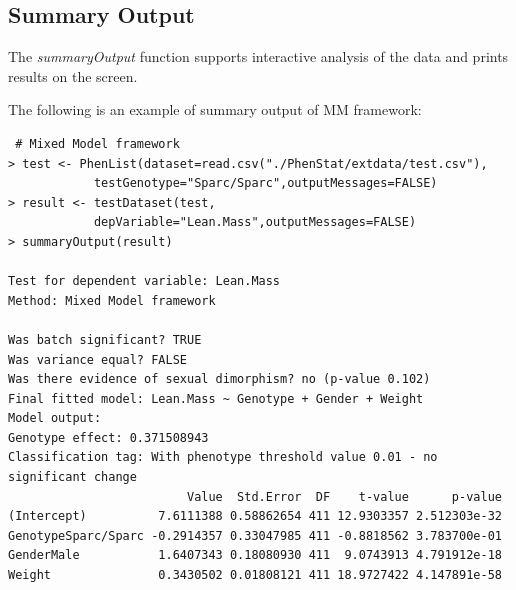 \documentclass[12pt,a4paper]{article}
\begin{document}
\subsection{Summary Output}
\label{SummaryOutput}
The \textit{summaryOutput} function supports interactive analysis of the data and prints results on the screen.

The following is an example of summary output of MM framework:
\begingroup
    \fontsize{8pt}{12pt}\selectfont
\begin{verbatim}
 # Mixed Model framework
> test <- PhenList(dataset=read.csv("./PhenStat/extdata/test.csv"),
            testGenotype="Sparc/Sparc",outputMessages=FALSE)
> result <- testDataset(test,
            depVariable="Lean.Mass",outputMessages=FALSE)
> summaryOutput(result)

Test for dependent variable: Lean.Mass
Method: Mixed Model framework

Was batch significant? TRUE
Was variance equal? FALSE
Was there evidence of sexual dimorphism? no (p-value 0.102)
Final fitted model: Lean.Mass ~ Genotype + Gender + Weight
Model output:
Genotype effect: 0.371508943
Classification tag: With phenotype threshold value 0.01 - no significant change
                         Value  Std.Error  DF    t-value      p-value
(Intercept)          7.6111388 0.58862654 411 12.9303357 2.512303e-32
GenotypeSparc/Sparc -0.2914357 0.33047985 411 -0.8818562 3.783700e-01
GenderMale           1.6407343 0.18080930 411  9.0743913 4.791912e-18
Weight               0.3430502 0.01808121 411 18.9727422 4.147891e-58
\end{verbatim}
\endgroup
\end{document}
